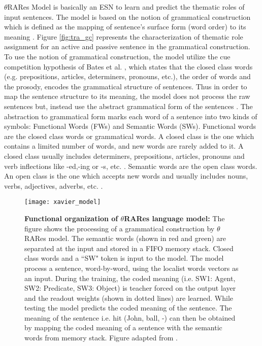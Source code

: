 $\theta$RARes Model is basically an ESN to learn and predict the thematic roles of input sentences. The model is based on the notion of grammatical construction \cite{gc:goldberg:1995} which is defined as the mapping of sentence's surface form (word order) to its meaning \cite{xavier:2013:RT}. Figure \ref{fig:tra_gc} represents the characterization of thematic role assignment for an active and passive sentence in the grammatical construction. To use the notion of grammatical construction, the model utilize the cue competition hypothesis of Bates et al. \cite{tra:bates:1982}, which states that the closed class words (e.g. prepositions, articles, determiners, pronouns, etc.), the order of words and the prosody, encodes the grammatical structure of sentences. Thus in order to map the sentence structure to its meaning, the model does not process the raw sentences but, instead use the abstract grammatical form of the sentences \cite{xavier:2013:RT, tra:dominey:2003}. The abstraction to grammatical form marks each word of a sentence into two kinds of symbols: Functional Words (FWs) and Semantic Words (SWs). Functional words are the closed class words or grammatical words. A closed class is the one which contains a limited number of words, and new words are rarely added to it. A closed class usually includes determiners, prepositions, articles, pronouns and verb inflections like -ed,-ing or -s, etc. \cite{tra:open_close_class}. Semantic words are the open class words. An open class is the one which accepts new words and usually includes nouns, verbs, adjectives, adverbs, etc. \cite{tra:open_close_class}. 

\begin{figure}[hbtp]
\centering
\texttt{[image: xavier\_model]}
\caption[Functional organization of $\theta$RARes language model.]{\textbf{Functional organization of $\theta$RARes language model: }{\small The figure shows the processing of a grammatical construction by $\theta$RARes model. The semantic words (shown in red and green) are separated at the input and stored in a FIFO memory stack. Closed class words and a ``SW" token is input to the model. The model process a sentence, word-by-word, using the localist words vectors as an input. During the training, the coded meaning (i.e. SW1: Agent, SW2: Predicate, SW3: Object) is teacher forced on the output layer and the readout weights (shown in dotted lines) are learned. While testing the model predicts the coded meaning of the sentence. The meaning of the sentence i.e. hit (John, ball, -) can then be obtained by mapping the coded meaning of a sentence with the semantic words from memory stack. Figure adapted from \cite{xavier:2013:RT}.} }
\label{fig:xavier_model}
\end{figure}

